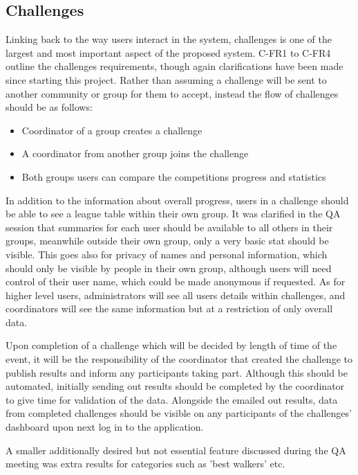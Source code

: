 \subsection{Challenges}
Linking back to the way users interact in the system, challenges is one of the largest and most important aspect of the proposed system. C-FR1 to C-FR4 outline the challenges requirements, though again clarifications have been made since starting this project. Rather than assuming a challenge will be sent to another community or group for them to accept, instead the flow of challenges should be as follows:
\begin{itemize}
\item Coordinator of a group creates a challenge
\item A coordinator from another group joins the challenge
\item Both groups users can compare the competitions progress and statistics
\end{itemize}
In addition to the information about overall progress, users in a challenge should be able to see a league table within their own group. It was clarified in the QA session that summaries for each user should be available to all others in their groups, meanwhile outside their own group, only a very basic stat should be visible. This goes also for privacy of names and personal information, which should only be visible by people in their own group, although users will need control of their user name, which could be made anonymous if requested. As for higher level users, administrators will see all users details within challenges, and coordinators will see the same information but at a restriction of only overall data. \par
Upon completion of a challenge which will be decided by length of time of the event, it will be the responsibility of the coordinator that created the challenge to publish results and inform any participants taking part. Although this should be automated, initially sending out results should be completed by the coordinator to give time for validation of the data. Alongside the emailed out results, data from completed challenges should be visible on any participants of the challenges' dashboard upon next log in to the application. \par
A smaller additionally desired but not essential feature discussed during the QA meeting was extra results for categories such as 'best walkers' etc.
